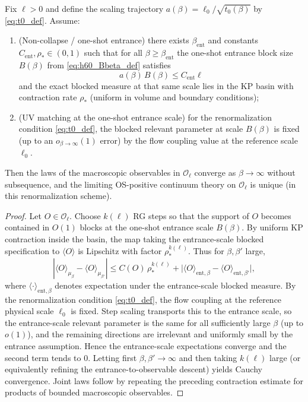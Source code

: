 \begin{theorem}\label{thm:uniqueness_on_Oell}
Fix $\ell>0$ and define the scaling trajectory $a(\beta)=\ell_0/\sqrt{t_0(\beta)}$ by \eqref{eq:t0_def}.
Assume:
\begin{enumerate}[leftmargin=*]
\item (Non-collapse / one-shot entrance) there exists $\beta_\mathrm{ent}$ and constants $C_{\mathrm{ent}},\rho_*\in(0,1)$ such that for all $\beta\ge\beta_\mathrm{ent}$ the one-shot entrance block size $B(\beta)$ from \eqref{eq:h60_Bbeta_def} satisfies
\[
 a(\beta)\,B(\beta)\le C_{\mathrm{ent}}\ell
\]
and the exact blocked measure at that same scale lies in the KP basin with contraction rate $\rho_*$ (uniform in volume and boundary conditions);
\item (UV matching at the one-shot entrance scale) for the renormalization condition \eqref{eq:t0_def}, the blocked relevant parameter at scale $B(\beta)$ is fixed (up to an $o_{\beta\to\infty}(1)$ error) by the flow coupling value at the reference scale $\ell_0$.
\end{enumerate}
Then the laws of the macroscopic observables in $\mathcal O_{\ell}$ converge as $\beta\to\infty$ without subsequence, and the limiting OS-positive continuum theory on $\mathcal O_{\ell}$ is unique (in this renormalization scheme).
\end{theorem}

\begin{proof}
Let $O\in\mathcal O_{\ell}$.
Choose $k(\ell)$ RG steps so that the support of $O$ becomes contained in $O(1)$ blocks at the one-shot entrance scale $B(\beta)$.
By uniform KP contraction inside the basin, the map taking the entrance-scale blocked specification to $\langle O\rangle$ is Lipschitz with factor $\rho_*^{k(\ell)}$.
Thus for $\beta,\beta'$ large,
\[
|\langle O\rangle_{\mu_\beta}-\langle O\rangle_{\mu_{\beta'}}|
\le C(O)\,\rho_*^{k(\ell)}
+ \big|\langle O\rangle_{\mathrm{ent},\beta}-\langle O\rangle_{\mathrm{ent},\beta'}\big|,
\]
where $\langle\cdot\rangle_{\mathrm{ent},\beta}$ denotes expectation under the entrance-scale blocked measure.
By the renormalization condition \eqref{eq:t0_def}, the flow coupling at the reference physical scale $\ell_0$ is fixed.
Step scaling transports this to the entrance scale, so the entrance-scale relevant parameter is the same for all sufficiently large $\beta$ (up to $o(1)$), and the remaining directions are irrelevant and uniformly small by the entrance assumption.
Hence the entrance-scale expectations converge and the second term tends to $0$.
Letting first $\beta,\beta'\to\infty$ and then taking $k(\ell)$ large (or equivalently refining the entrance-to-observable descent) yields Cauchy convergence.
Joint laws follow by repeating the preceding contraction estimate for products of bounded macroscopic observables.
\end{proof}

